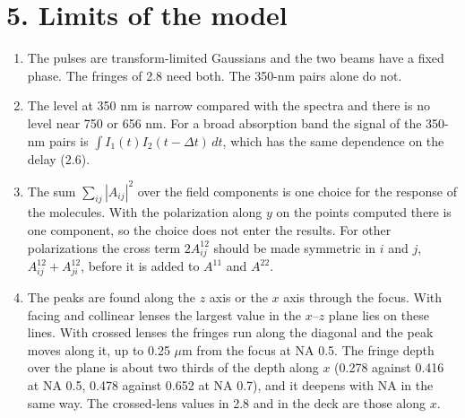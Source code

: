 \documentclass[10pt]{article}
\begin{document}
\section*{5. Limits of the model}
\begin{enumerate}
\item The pulses are transform-limited Gaussians and the two beams have a fixed phase. The fringes of 2.8 need
both. The 350-nm pairs alone do not.
\item The level at 350 nm is narrow compared with the spectra and there is no level near 750 or 656 nm. For a broad
absorption band the signal of the 350-nm pairs is $\int I_1(t)I_2(t-\Delta t)\,dt$, which has the same dependence
on the delay (2.6).
\item The sum $\sum_{ij}|A_{ij}|^2$ over the field components is one choice for the response of the molecules. With
the polarization along $y$ on the points computed there is one component, so the choice does not enter the results.
For other polarizations the cross term $2A^{12}_{ij}$ should be made symmetric in $i$ and $j$,
$A^{12}_{ij} + A^{12}_{ji}$, before it is added to $A^{11}$ and $A^{22}$.
\item The peaks are found along the $z$ axis or the $x$ axis through the focus. With facing and collinear lenses
the largest value in the $x$--$z$ plane lies on these lines. With crossed lenses the fringes run along the
diagonal and the peak moves along it, up to 0.25 $\mu$m from the focus at NA 0.5. The fringe depth over the plane is
about two thirds of the depth along $x$ (0.278 against 0.416 at NA 0.5, 0.478 against 0.652 at NA 0.7), and it
deepens with NA in the same way. The crossed-lens values in 2.8 and in the deck are those along $x$.
\end{enumerate}
\end{document}
